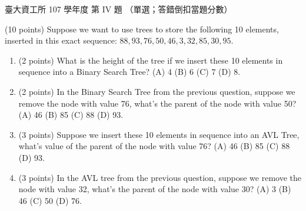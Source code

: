 \begin{pastexam}[label={px:ntu-107-dsa-04}]{臺大資工所 107 學年度 第 IV 題}
（單選；答錯倒扣當題分數）

(10 points) Suppose we want to use trees to store the following 10 elements, inserted in this
exact sequence: $88,93,76,50,46,3,32,85,30,95$.
\begin{enumerate}[label=\textbf{\arabic*.}, start=13]
\item (2 points) What is the height of the tree if we insert these 10 elements in sequence into a
Binary Search Tree? (A) 4 (B) 6 (C) 7 (D) 8.
\item (2 points) In the Binary Search Tree from the previous question, suppose we remove the node
with value 76, what's the parent of the node with value 50? (A) 46 (B) 85 (C) 88 (D) 93.
\item (3 points) Suppose we insert these 10 elements in sequence into an AVL Tree, what's value of
the parent of the node with value 76? (A) 46 (B) 85 (C) 88 (D) 93.
\item (3 points) In the AVL tree from the previous question, suppose we remove the node with value
32, what's the parent of the node with value 30? (A) 3 (B) 46 (C) 50 (D) 76.
\end{enumerate}
\end{pastexam}

